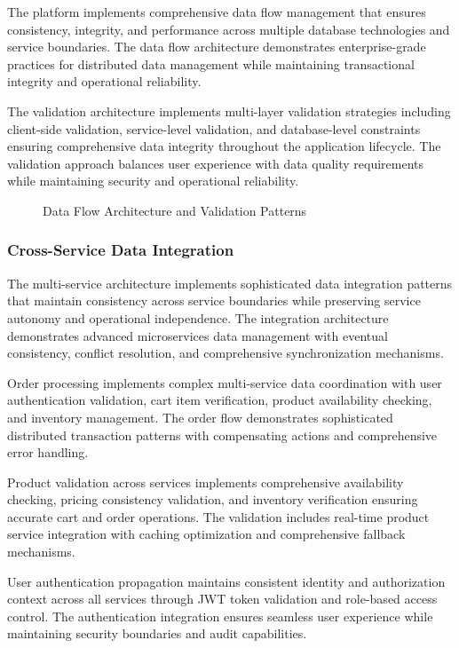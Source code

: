 The platform implements comprehensive data flow management that ensures consistency, integrity, and performance across multiple database technologies and service boundaries. The data flow architecture demonstrates enterprise-grade practices for distributed data management while maintaining transactional integrity and operational reliability.

The validation architecture implements multi-layer validation strategies including client-side validation, service-level validation, and database-level constraints ensuring comprehensive data integrity throughout the application lifecycle. The validation approach balances user experience with data quality requirements while maintaining security and operational reliability.

\begin{figure}[H]
\centering
\caption{Data Flow Architecture and Validation Patterns}
\label{fig:data-flow-validation-architecture}
\end{figure}

\subsubsection{Cross-Service Data Integration}

The multi-service architecture implements sophisticated data integration patterns that maintain consistency across service boundaries while preserving service autonomy and operational independence. The integration architecture demonstrates advanced microservices data management with eventual consistency, conflict resolution, and comprehensive synchronization mechanisms.

Order processing implements complex multi-service data coordination with user authentication validation, cart item verification, product availability checking, and inventory management. The order flow demonstrates sophisticated distributed transaction patterns with compensating actions and comprehensive error handling.

Product validation across services implements comprehensive availability checking, pricing consistency validation, and inventory verification ensuring accurate cart and order operations. The validation includes real-time product service integration with caching optimization and comprehensive fallback mechanisms.

User authentication propagation maintains consistent identity and authorization context across all services through JWT token validation and role-based access control. The authentication integration ensures seamless user experience while maintaining security boundaries and audit capabilities.

